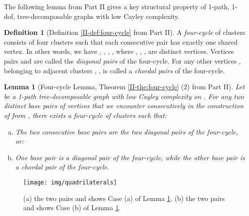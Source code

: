 \documentclass[secthm,amsthm,english]{article}
\newtheorem{lemma}{Lemma}
\theoremstyle{definition}
\newtheorem{definition}{Definition}
\theoremstyle{remark}
\begin{document}
The following lemma from Part II gives a key structural property of 1-path, 1-dof, tree-decomposable graphs with low Cayley complexity.


\begin{definition}[Definition \ref{II-def:four-cycle} from Part II]
A {\emph{four-cycle}} of clusters consists of four clusters  such that each consecutive pair has exactly one shared vertex. 
In other words, we have , , , , where , , ,  are distinct vertices.
Vertices pairs  and  are called the \emph{diagonal pairs} of the four-cycle. 
For any other vertices ,  belonging to adjacent clusters , , 
 is called a {\emph{chordal pairs}} of the four-cycle. 
\end{definition}


\begin{lemma}[Four-cycle Lemma, Theorem \ref{II-the:four-cycle} (2) from Part II] \label{lem:QIM}
Let  be a 1-path tree-decomposable graph with low Cayley complexity on . 
For any two distinct base pairs of vertices that we encounter consecutively in the construction of  from , 
there exists a four-cycle of clusters such that: 

\begin{enumerate}[(a)]
\item The two consecutive base pairs are the two diagonal pairs of the four-cycle, or:

\item One  base pair is a diagonal pair of the four-cycle, while the other base pair is a chordal pair of the four-cycle. 
\end{enumerate}

\end{lemma}







\begin{figure}[h]
	  
	  
	  
	  
	 
	     
	   
	 
	
	\begin{centering}
	\texttt{[image: img/quadrilaterals]} 
	\par\end{centering}
	
	\caption{(a) the two pairs  and  shows Case (a) of Lemma \ref{lem:QIM}.
	(b) the two pairs  and  shows Case (b) of Lemma \ref{lem:QIM}.}
\label{F:quadrilaterals} 
\end{figure}
\end{document}

